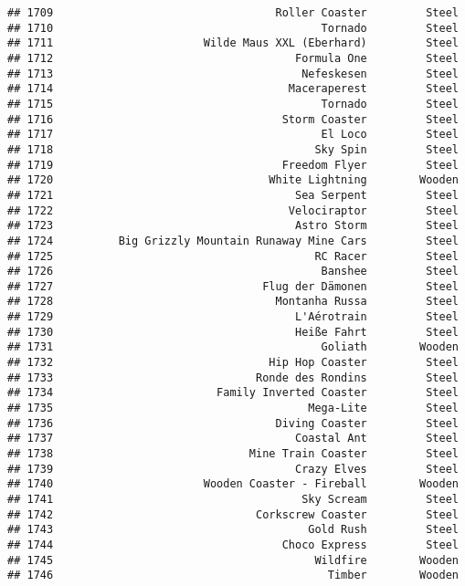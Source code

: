\documentclass[
]{article}
\begin{document}
\begin{verbatim}
## 1709                                  Roller Coaster         Steel
## 1710                                         Tornado         Steel
## 1711                       Wilde Maus XXL (Eberhard)         Steel
## 1712                                     Formula One         Steel
## 1713                                      Nefeskesen         Steel
## 1714                                    Maceraperest         Steel
## 1715                                         Tornado         Steel
## 1716                                   Storm Coaster         Steel
## 1717                                         El Loco         Steel
## 1718                                        Sky Spin         Steel
## 1719                                   Freedom Flyer         Steel
## 1720                                 White Lightning        Wooden
## 1721                                     Sea Serpent         Steel
## 1722                                    Velociraptor         Steel
## 1723                                     Astro Storm         Steel
## 1724          Big Grizzly Mountain Runaway Mine Cars         Steel
## 1725                                        RC Racer         Steel
## 1726                                         Banshee         Steel
## 1727                                Flug der Dämonen         Steel
## 1728                                  Montanha Russa         Steel
## 1729                                     L'Aérotrain         Steel
## 1730                                     Heiße Fahrt         Steel
## 1731                                         Goliath        Wooden
## 1732                                 Hip Hop Coaster         Steel
## 1733                               Ronde des Rondins         Steel
## 1734                         Family Inverted Coaster         Steel
## 1735                                       Mega-Lite         Steel
## 1736                                  Diving Coaster         Steel
## 1737                                     Coastal Ant         Steel
## 1738                              Mine Train Coaster         Steel
## 1739                                     Crazy Elves         Steel
## 1740                       Wooden Coaster - Fireball        Wooden
## 1741                                      Sky Scream         Steel
## 1742                               Corkscrew Coaster         Steel
## 1743                                       Gold Rush         Steel
## 1744                                   Choco Express         Steel
## 1745                                        Wildfire        Wooden
## 1746                                          Timber        Wooden

\end{verbatim}
\end{document}
